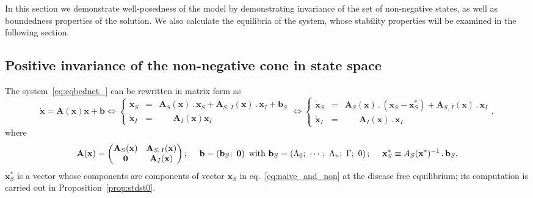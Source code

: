 \documentclass[a4paper]{article}
\begin{document}
\noindent 
In this section we demonstrate well-posedness of the model by demonstrating invariance of the set of non-negative states, as well as boundedness properties of the solution. We also calculate the equilibria of the system, whose stability properties will be examined in the following section.
 

\subsection{Positive invariance of the non-negative cone in state space}\label{subsec.pinn}
 
The
system~\eqref{eq:eqbednet_} can be rewritten  in matrix form as 
\begin{equation} \label{eq:eqmodel}\dot{\mathbf x}=\mathbf A(\mathbf x)\mathbf x + \mathbf  b
 \Leftrightarrow \left\{\begin{array}{ccc}\dot{\mathbf x}_S & = & \mathbf A_S(\mathbf x)\,.\,\mathbf x_S  + \mathbf A_{S,\,I}(\mathbf x)\,.\,\mathbf x_I  +   \mathbf b_S\\
   \dot{\mathbf x}_I & = & \;\;\;\;\;\;\mathbf A_I(\mathbf x)\mathbf x_I
\end{array}\right. 
\Leftrightarrow \left\{\begin{array}{ccr}\dot{\mathbf x}_S & = & \mathbf A_S(\mathbf x)\,.\, \left(\mathbf x_S - \mathbf x^*_S\right)  +  \mathbf A_{S,\,I}(\mathbf x)\,.\,\mathbf x_I \\
   \dot{\mathbf x}_I & = & \;\;\;\;\;\;\mathbf A_I(\mathbf x)\,.\,\mathbf x_I
\end{array}\right. ,
\end{equation}
where 
\begin{equation}\label{eq:eqmodel1}
\mathbf A(\mathbf x)=\begin{pmatrix}
\mathbf A_S(\mathbf x) &\mathbf A_{S,\,I}(\mathbf x)\cr \mathbf 0&\mathbf A_I(\mathbf x)
\end{pmatrix};~~~~ \mathbf b = \left(\mathbf b_S;~\mathbf 0\right)~\text{with}~\mathbf b_{S}=\left(\Lambda_0;~\cdots;~\Lambda_n;~\Gamma;~0\right);~~~~
\mathbf x^*_S \equiv  A_S(\mathbf x^*)^{-1} \,.\, \mathbf b_S.
\end{equation}
$\mathbf x^*_S$ is a vector whose components are components of vector $\mathbf x_S$ in eq.~\eqref{eq:naive_and_non} at the disease free equilibrium; its computation is carried out in Proposition~\ref{prop:stdst0}.
\end{document}
